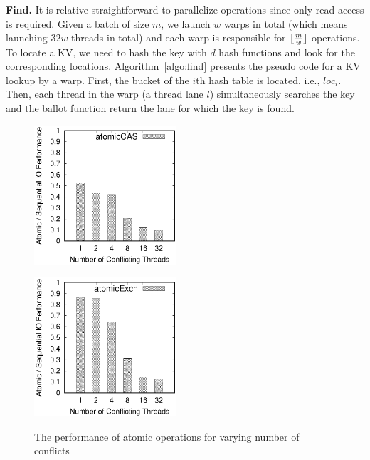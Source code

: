 \vspace{1mm}\noindent\textbf{Find.} It is relative straightforward to parallelize  operations since only read access is required. 
Given a batch of size $m$, we launch $w$ warps in total (which means launching $32w$ threads in total) and each warp is responsible for $\lfloor\frac{m}{w}\rfloor$  operations. To locate a KV, we need to hash the key with $d$ hash functions and look for the corresponding locations. 
Algorithm~\ref{algo:find} presents the pseudo code for a KV lookup by a warp. 
First, the bucket of the $i$th hash table is located, i.e., $loc_i$.
Then, each thread in the warp (a thread lane $l$) simultaneously searches the key and the ballot function return the lane for which the key is found.

\begin{figure}[t]
	\hspace{-3em}
	\begin{minipage}{0.5\linewidth}
		\label{fig:atomicCAS}
		\includegraphics[width=5.3cm]{exp/atomic/atomicCAS.eps}
	\end{minipage}
	\hspace{-1em}
	\begin{minipage}{0.5\linewidth}
		\label{fig:atomicExch}
		\includegraphics[width=5.3cm]{exp/atomic/atomicExch.eps}
	\end{minipage}
	\caption{The performance of atomic operations for varying number of conflicts}
	\label{fig:atomic}
\end{figure}



